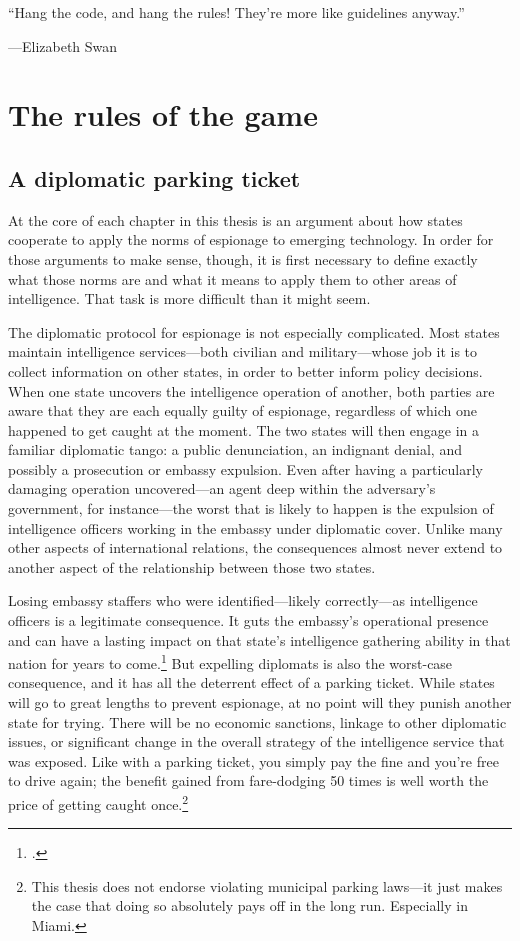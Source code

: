 \documentclass{memoir}
\begin{document}
\begin{refsegment}
\epigraph{``Hang the code, and hang the rules! They're more like guidelines anyway.''}{---\textup{Elizabeth Swan}}

\section{The rules of the game}
\subsection{A diplomatic parking ticket}
At the core of each chapter in this thesis is an argument about how states cooperate to apply the norms of espionage to emerging technology. In order for those arguments to make sense, though, it is first necessary to define exactly what those norms are and what it means to apply them to other areas of intelligence. That task is more difficult than it might seem.

The diplomatic protocol for espionage is not especially complicated. Most states maintain intelligence services---both civilian and military---whose job it is to collect information on other states, in order to better inform policy decisions. When one state uncovers the intelligence operation of another, both parties are aware that they are each equally guilty of espionage, regardless of which one happened to get caught at the moment. The two states will then engage in a familiar diplomatic tango: a public denunciation, an indignant denial, and possibly a prosecution or embassy expulsion. Even after having a particularly damaging operation uncovered---an agent deep within the adversary's government, for instance---the worst that is likely to happen is the expulsion of intelligence officers working in the embassy under diplomatic cover. Unlike many other aspects of international relations, the consequences almost never extend to another aspect of the relationship between those two states.

Losing embassy staffers who were identified---likely correctly---as intelligence officers is a legitimate consequence. It guts the embassy's operational presence and can have a lasting impact on that state's intelligence gathering ability in that nation for years to come.\footcite{macintyre_spy_2018} But expelling diplomats is also the worst-case consequence, and it has all the deterrent effect of a parking ticket. While states will go to great lengths to prevent espionage, at no point will they punish another state for trying. There will be no economic sanctions, linkage to other diplomatic issues, or significant change in the overall strategy of the intelligence service that was exposed. Like with a parking ticket, you simply pay the fine and you're free to drive again; the benefit gained from fare-dodging 50 times is well worth the price of getting caught once.\footnote{This thesis does not endorse violating municipal parking laws---it just makes the case that doing so absolutely pays off in the long run. Especially in Miami.}


\end{refsegment}
\end{document}
